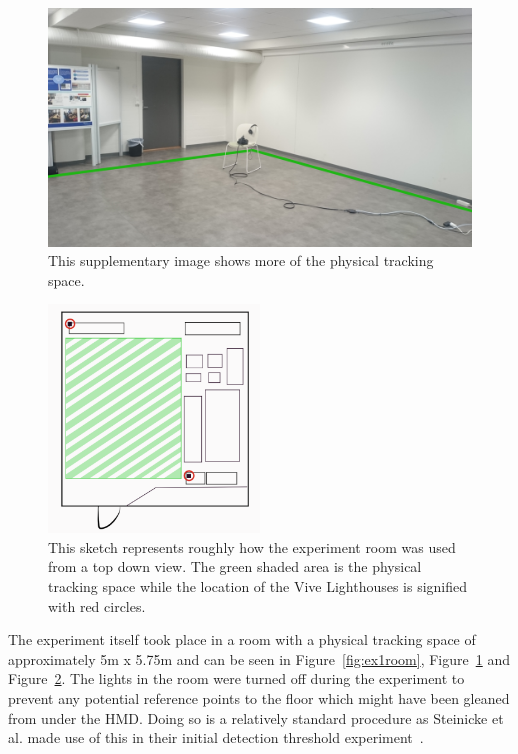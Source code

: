 \begin{figure}[tbph]
    \centering
    \includegraphics[width=1\textwidth]{figures/images/extraRoomImage.jpg}
    \caption[Supplementary Image of Experiment Environment]{This supplementary image shows more of the physical tracking space.}
    \label{fig:ex1roomImage2}
\end{figure}

\begin{figure}[tbph]
    \centering
    \includegraphics[width=0.5\textwidth]{figures/images/topDownRoom.png}
    \caption[Top Down Representation of Experiment Environment]{This sketch represents roughly how the experiment room was used from a top down view. The green shaded area is the physical tracking space while the location of the Vive Lighthouses is signified with red circles.}
    \label{fig:ex1roomTopDown}
\end{figure}

The experiment itself took place in a room with a physical tracking space of approximately 5m x 5.75m and can be seen in Figure~\ref{fig:ex1room}, Figure~\ref{fig:ex1roomImage2} and Figure~\ref{fig:ex1roomTopDown}. The lights in the room were turned off during the experiment to prevent any potential reference points to the floor which might have been gleaned from under the HMD. Doing so is a relatively standard procedure as Steinicke et al. made use of this in their initial detection threshold experiment~\cite{5072212}. 

